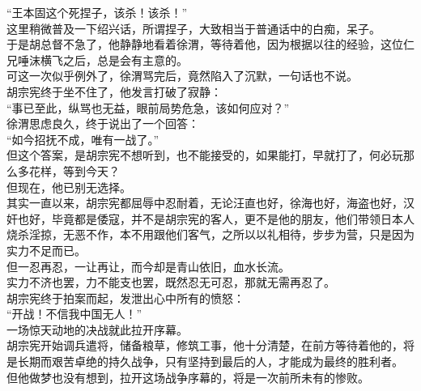 \begin{multicols}{\theparacolNo}
“王本固这个死捏子，该杀！该杀！”\\

这里稍微普及一下绍兴话，所谓捏子，大致相当于普通话中的白痴，呆子。\\

于是胡总督不急了，他静静地看着徐渭，等待着他，因为根据以往的经验，这位仁兄唾沫横飞之后，总是会有主意的。\\

可这一次似乎例外了，徐渭骂完后，竟然陷入了沉默，一句话也不说。\\

胡宗宪终于坐不住了，他发言打破了寂静：\\

“事已至此，纵骂也无益，眼前局势危急，该如何应对？”\\

徐渭思虑良久，终于说出了一个回答：\\

“如今招抚不成，唯有一战了。”\\

但这个答案，是胡宗宪不想听到，也不能接受的，如果能打，早就打了，何必玩那么多花样，等到今天？\\

但现在，他已别无选择。\\

其实一直以来，胡宗宪都屈辱中忍耐着，无论汪直也好，徐海也好，海盗也好，汉奸也好，毕竟都是倭寇，并不是胡宗宪的客人，更不是他的朋友，他们带领日本人烧杀淫掠，无恶不作，本不用跟他们客气，之所以以礼相待，步步为营，只是因为实力不足而已。\\

但一忍再忍，一让再让，而今却是青山依旧，血水长流。\\

实力不济也罢，力不能支也罢，既然忍无可忍，那就无需再忍了。\\

胡宗宪终于拍案而起，发泄出心中所有的愤怒：\\

“开战！不信我中国无人！”\\

一场惊天动地的决战就此拉开序幕。\\

胡宗宪开始调兵遣将，储备粮草，修筑工事，他十分清楚，在前方等待着他的，将是长期而艰苦卓绝的持久战争，只有坚持到最后的人，才能成为最终的胜利者。\\

但他做梦也没有想到，拉开这场战争序幕的，将是一次前所未有的惨败。\\


\end{multicols}

